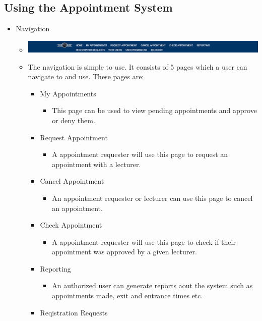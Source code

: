 \subsection{Using the Appointment System}
	\begin{itemize}
		\item Navigation
			\begin{itemize}
				\item \includegraphics[width=\linewidth]{images/Screenshots/Navigation.png}
				\item The navigation is simple to use. It consists of 5 pages which a user can navigate to and use. These pages are:
				\begin{itemize}
					\item My Appointments
						\begin{itemize}
							\item This page can be used to view pending appointments and approve or deny them.
						\end{itemize}
					\item Request Appointment
						\begin{itemize}
							\item A appointment requester will use this page to request an appointment with a lecturer.
						\end{itemize}
					\item Cancel Appointment
						\begin{itemize}
							\item An appointment requester or lecturer can use this page to cancel an appointment.
						\end{itemize}
					\item Check Appointment
						\begin{itemize}
							\item A appointment requester will use this page to check if their appointment was approved by a given lecturer.
						\end{itemize}
					\item Reporting
						\begin{itemize}
							\item An authorized user can generate reports aout the system such as appointments made, exit and entrance times etc. 
						\end{itemize}
					\item Reqistration Requests

\end{itemize}
\end{itemize}
\end{itemize}
